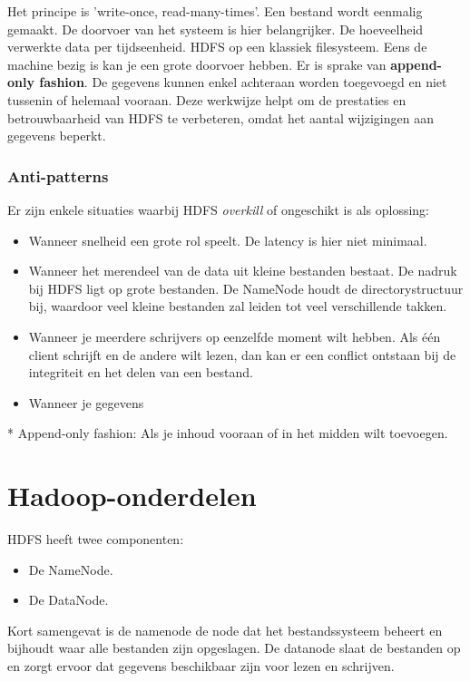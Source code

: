 \documentclass[a4paper,10pt,twoside]{report}
\begin{document}
Het principe is 'write-once, read-many-times'. Een bestand wordt eenmalig gemaakt. De doorvoer van het systeem is hier belangrijker. De hoeveelheid verwerkte data per tijdseenheid. HDFS op een klassiek filesysteem. Eens de machine bezig is kan je een grote doorvoer hebben. Er is sprake van \textbf{append-only fashion}. De gegevens kunnen enkel achteraan worden toegevoegd en niet tussenin of helemaal vooraan. Deze werkwijze helpt om de prestaties en betrouwbaarheid van HDFS te verbeteren, omdat het aantal wijzigingen aan gegevens beperkt. 

\subsubsection{Anti-patterns}

Er zijn enkele situaties waarbij HDFS \textit{overkill} of ongeschikt is als oplossing:

\begin{itemize}
	\item Wanneer snelheid een grote rol speelt. De latency is hier niet minimaal.
	\item Wanneer het merendeel van de data uit kleine bestanden bestaat. De nadruk bij HDFS ligt op grote bestanden. De NameNode houdt de directorystructuur bij, waardoor veel kleine bestanden zal leiden tot veel verschillende takken.
	\item Wanneer je meerdere schrijvers op eenzelfde moment wilt hebben. Als één client schrijft en de andere wilt lezen, dan kan er een conflict ontstaan bij de integriteit en het delen van een bestand.
	\item Wanneer je gegevens
\end{itemize}

* Append-only fashion: Als je inhoud vooraan of in het midden wilt toevoegen.


\section{Hadoop-onderdelen}

HDFS heeft twee componenten:

\begin{itemize}
	\item De NameNode.
	\item De DataNode.
\end{itemize}

Kort samengevat is de namenode de node dat het bestandssysteem beheert en bijhoudt waar alle bestanden zijn opgeslagen. De datanode slaat de bestanden op en zorgt ervoor dat gegevens beschikbaar zijn voor lezen en schrijven.
\end{document}
